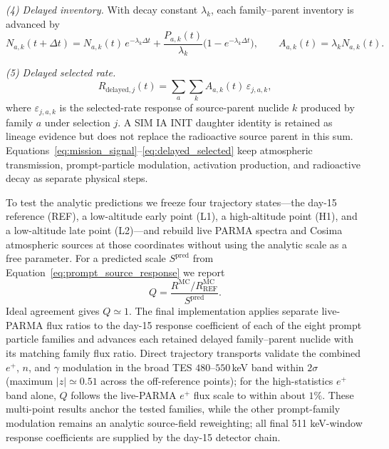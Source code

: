 \documentclass[11pt]{article}
\begin{document}
\emph{(4) Delayed inventory.} With decay constant $\lambda_k$, each family--parent
inventory is advanced by
\begin{equation}
  N_{a,k}(t+\Delta t)=N_{a,k}(t)\,e^{-\lambda_k\Delta t}
  +\frac{P_{a,k}(t)}{\lambda_k}\bigl(1-e^{-\lambda_k\Delta t}\bigr),
  \qquad A_{a,k}(t)=\lambda_k N_{a,k}(t).
  \label{eq:delayed_inventory}
\end{equation}

\emph{(5) Delayed selected rate.}
\begin{equation}
  R_{\mathrm{delayed},j}(t)=\sum_{a}\sum_{k} A_{a,k}(t)\,\varepsilon_{j,a,k},
  \label{eq:delayed_selected}
\end{equation}
where $\varepsilon_{j,a,k}$ is the selected-rate response of source-parent
nuclide $k$ produced by family $a$ under selection $j$. A SIM IA INIT daughter
identity is retained as lineage evidence but does not replace the radioactive
source parent in this sum. Equations~\eqref{eq:mission_signal}--\eqref{eq:delayed_selected}
keep atmospheric transmission, prompt-particle modulation, activation production,
and radioactive decay as separate physical steps.

To test the analytic predictions we freeze four trajectory states---the day-15 reference (REF), a low-altitude early point (L1), a high-altitude point (H1), and a low-altitude late point (L2)---and rebuild live PARMA spectra and Cosima atmospheric sources at those coordinates without using the analytic scale as a free parameter. For a predicted scale $S^{\mathrm{pred}}$ from Equation~\eqref{eq:prompt_source_response} we report
\begin{equation}
  Q=\frac{R^{\mathrm{MC}}/R^{\mathrm{MC}}_{\mathrm{REF}}}{S^{\mathrm{pred}}}.
\end{equation}
Ideal agreement gives $Q\simeq1$. The final implementation applies separate
live-PARMA flux ratios to the day-15 response coefficient of each of the eight
prompt particle families and advances each retained delayed family--parent
nuclide with its matching family flux ratio. Direct trajectory transports validate the combined $e^+$,
$n$, and $\gamma$ modulation in the broad TES $480$--$550$\,keV band within
$2\sigma$ (maximum $|z|\simeq0.51$ across the off-reference points); for the
high-statistics $e^+$ band alone, $Q$ follows the live-PARMA $e^+$ flux scale
to within about $1\%$. These multi-point results anchor the tested families,
while the other prompt-family modulation remains an analytic source-field
reweighting; all final 511 keV-window response coefficients are supplied by the
day-15 detector chain.
\end{document}
